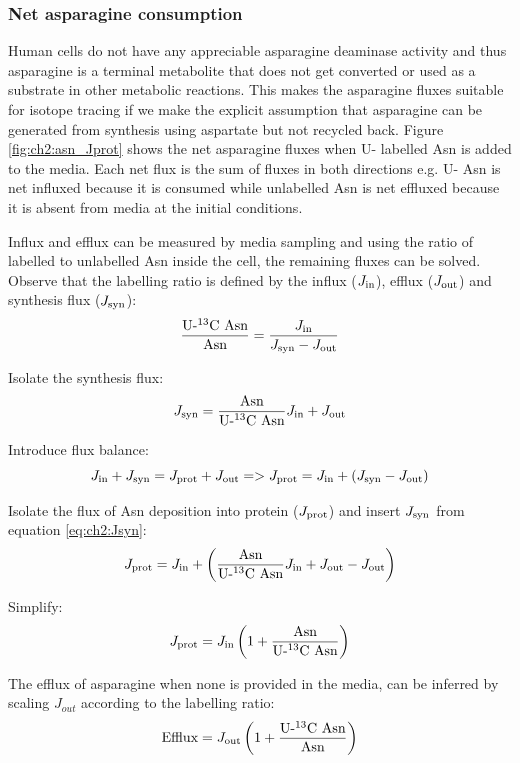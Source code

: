 \subsubsection{Net asparagine consumption}
Human cells do not have any appreciable asparagine deaminase activity \cite{Sullivan2018-gz} and thus asparagine is a terminal metabolite that does not get converted or used as a substrate in other metabolic reactions.
This makes the asparagine fluxes suitable for isotope tracing if we make the explicit assumption that asparagine can be generated from synthesis using aspartate but not recycled back.
Figure \ref{fig:ch2:asn_Jprot} shows the net asparagine fluxes when U-\hCi{} labelled Asn is added to the media.
Each net flux is the sum of fluxes in both directions e.g. U-\hCi{} Asn is net influxed because it is consumed while unlabelled Asn is net effluxed because it is absent from media at the initial conditions.

Influx and efflux can be measured by media sampling and using the ratio of labelled to unlabelled Asn inside the cell, the remaining fluxes can be solved.
Observe that the labelling ratio is defined by the influx ($J_{\text{in}}$), efflux ($J_{\text{out}}$) and synthesis flux ($J_{\text{syn}}$):
\begin{equation}
    \frac{\text{U-\textsuperscript{13}C Asn}}{\text{Asn}} = \frac{J_{\text{in}}}{J_{\text{syn}} - J_{\text{out}}}
\end{equation}

Isolate the synthesis flux:
\begin{equation}
    J_{\text{syn}} = \frac{\text{Asn}}{\text{U-\textsuperscript{13}C Asn}} J_{\text{in}} + J_{\text{out}}
\label{eq:ch2:Jsyn}
\end{equation}

Introduce flux balance:
\begin{equation}
    J_{\text{in}} + J_{\text{syn}} = J_{\text{prot}} + J_{\text{out}} => J_{\text{prot}} = J_{\text{in}} + (J_{\text{syn}} - J_{\text{out}})
\end{equation}

Isolate the flux of Asn deposition into protein ($J_{\text{prot}}$) and insert $J_{\text{syn}}$ from equation \ref{eq:ch2:Jsyn}:
\begin{equation}
    J_{\text{prot}} = J_{\text{in}} + \left( \frac{\text{Asn}}{\text{U-\textsuperscript{13}C Asn}} J_{\text{in}} + J_{\text{out}} - J_{\text{out}} \right)
\end{equation}

Simplify:
\begin{equation}
    J_{\text{prot}} = J_{\text{in}} \left( 1 + \frac{\text{Asn}}{\text{U-\textsuperscript{13}C Asn}} \right)
\label{eq:ch2:Jprot}
\end{equation}

The efflux of asparagine when none is provided in the media, can be inferred by scaling $J_{out}$ according to the labelling ratio:
\begin{equation}
    \text{Efflux} = J_{\text{out}} \left( 1 + \frac{\text{U-\textsuperscript{13}C Asn}}{\text{Asn}} \right)
\label{eq:ch2:efflux}
\end{equation}



